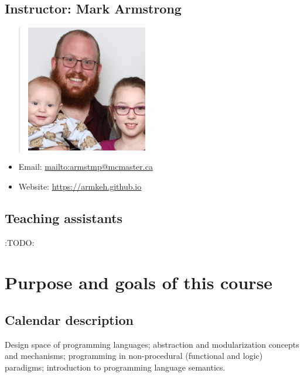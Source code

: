 \documentclass[11pt]{article}
\theoremstyle{definition}
\begin{document}
\subsection{Instructor: Mark Armstrong}
\label{sec:orgf535182}
\begin{quote}
\includegraphics[width=200px]{./media/markarmstrong.jpg}
\end{quote}

\begin{itemize}
\item Email: \url{mailto:armstmp@mcmaster.ca}
\item Website: \url{https://armkeh.github.io}
\end{itemize}

\subsection{Teaching assistants}
\label{sec:orge8ec45e}
:TODO:

\section{Purpose and goals of this course}
\label{sec:orgf607cd6}
\subsection{Calendar description}
\label{sec:org4ea5367}
Design space of programming languages;
abstraction and modularization concepts and mechanisms;
programming in non-procedural (functional and logic) paradigms;
introduction to programming language semantics.
\end{document}
